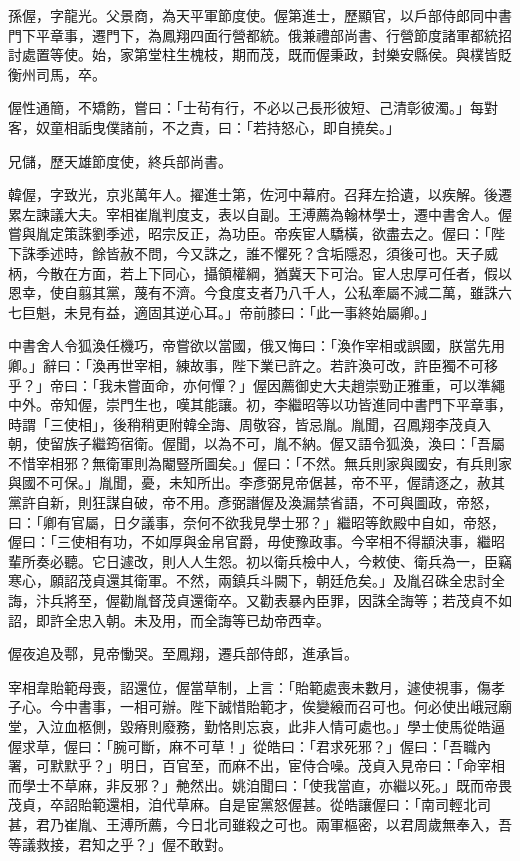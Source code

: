 \begin{pinyinscope}
 孫偓，字龍光。父景商，為天平軍節度使。偓第進士，歷顯官，以戶部侍郎同中書門下平章事，遷門下，為鳳翔四面行營都統。俄兼禮部尚書、行營節度諸軍都統招討處置等使。始，家第堂柱生槐枝，期而茂，既而偓秉政，封樂安縣侯。與樸皆貶衡州司馬，卒。



 偓性通簡，不矯飭，嘗曰：「士茍有行，不必以己長形彼短、己清彰彼濁。」每對客，奴童相詬曳僕諸前，不之責，曰：「若持怒心，即自撓矣。」



 兄儲，歷天雄節度使，終兵部尚書。



 韓偓，字致光，京兆萬年人。擢進士第，佐河中幕府。召拜左拾遺，以疾解。後遷累左諫議大夫。宰相崔胤判度支，表以自副。王溥薦為翰林學士，遷中書舍人。偓嘗與胤定策誅劉季述，昭宗反正，為功臣。帝疾宦人驕橫，欲盡去之。偓曰：「陛下誅季述時，餘皆赦不問，今又誅之，誰不懼死？含垢隱忍，須後可也。天子威柄，今散在方面，若上下同心，攝領權綱，猶冀天下可治。宦人忠厚可任者，假以恩幸，使自翦其黨，蔑有不濟。今食度支者乃八千人，公私牽屬不減二萬，雖誅六七巨魁，未見有益，適固其逆心耳。」帝前膝曰：「此一事終始屬卿。」



 中書舍人令狐渙任機巧，帝嘗欲以當國，俄又悔曰：「渙作宰相或誤國，朕當先用卿。」辭曰：「渙再世宰相，練故事，陛下業已許之。若許渙可改，許臣獨不可移乎？」帝曰：「我未嘗面命，亦何憚？」偓因薦御史大夫趙崇勁正雅重，可以準繩中外。帝知偓，崇門生也，嘆其能讓。初，李繼昭等以功皆進同中書門下平章事，時謂「三使相」，後稍稍更附韓全誨、周敬容，皆忌胤。胤聞，召鳳翔李茂貞入朝，使留族子繼筠宿衛。偓聞，以為不可，胤不納。偓又語令狐渙，渙曰：「吾屬不惜宰相邪？無衛軍則為閹豎所圖矣。」偓曰：「不然。無兵則家與國安，有兵則家與國不可保。」胤聞，憂，未知所出。李彥弼見帝倨甚，帝不平，偓請逐之，赦其黨許自新，則狂謀自破，帝不用。彥弼譖偓及渙漏禁省語，不可與圖政，帝怒，曰：「卿有官屬，日夕議事，奈何不欲我見學士邪？」繼昭等飲殿中自如，帝怒，偓曰：「三使相有功，不如厚與金帛官爵，毋使豫政事。今宰相不得顓決事，繼昭輩所奏必聽。它日遽改，則人人生怨。初以衛兵檢中人，今敕使、衛兵為一，臣竊寒心，願詔茂貞還其衛軍。不然，兩鎮兵斗闕下，朝廷危矣。」及胤召硃全忠討全誨，汴兵將至，偓勸胤督茂貞還衛卒。又勸表暴內臣罪，因誅全誨等；若茂貞不如詔，即許全忠入朝。未及用，而全誨等已劫帝西幸。



 偓夜追及鄠，見帝慟哭。至鳳翔，遷兵部侍郎，進承旨。



 宰相韋貽範母喪，詔還位，偓當草制，上言：「貽範處喪未數月，遽使視事，傷孝子心。今中書事，一相可辦。陛下誠惜貽範才，俟變縗而召可也。何必使出峨冠廟堂，入泣血柩側，毀瘠則廢務，勤恪則忘哀，此非人情可處也。」學士使馬從皓逼偓求草，偓曰：「腕可斷，麻不可草！」從皓曰：「君求死邪？」偓曰：「吾職內署，可默默乎？」明日，百官至，而麻不出，宦侍合噪。茂貞入見帝曰：「命宰相而學士不草麻，非反邪？」艴然出。姚洎聞曰：「使我當直，亦繼以死。」既而帝畏茂貞，卒詔貽範還相，洎代草麻。自是宦黨怒偓甚。從皓讓偓曰：「南司輕北司甚，君乃崔胤、王溥所薦，今日北司雖殺之可也。兩軍樞密，以君周歲無奉入，吾等議救接，君知之乎？」偓不敢對。




\end{pinyinscope}
